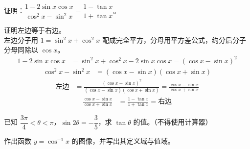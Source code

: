 \documentclass[12pt,a4paper]{exam-zh}
\begin{document}
\begin{question}[points = 6]
    证明：$\dfrac{1-2\sin x\cos x}{\cos^2 x-\sin^2 x}=\dfrac{1-\tan x}{1+\tan x}$。
\end{question}

\begin{solution}
    证明左边等于右边。 \\
    左边分子用 $1=\sin^2x+\cos^2x$ 配成完全平方，分母用平方差公式，约分后分子分母同除以 $\cos x$。 \\
    \begin{align*}
        1-2\sin x\cos x &= \sin^2x+\cos^2x-2\sin x\cos x = (\cos x-\sin x)^2
    \end{align*}
    \begin{align*}
        \cos^2x-\sin^2x &= (\cos x-\sin x)(\cos x+\sin x)
    \end{align*}
    \begin{align*}
        \text{左边} &= \frac{(\cos x-\sin x)^2}{(\cos x-\sin x)(\cos x+\sin x)} = \frac{\cos x-\sin x}{\cos x+\sin x}
    \end{align*}
    \begin{align*}
        \frac{\cos x-\sin x}{\cos x+\sin x} &= \frac{1-\tan x}{1+\tan x} = \text{右边}
    \end{align*}
\end{solution}

\begin{question}[points = 8]
    \begin{questionparts}
        \item 已知 $\dfrac{3\pi}{4}<\theta<\pi$，$\sin2\theta=-\dfrac{3}{5}$，求 $\tan\theta$ 的值。（不得使用计算器） 

        \item 作出函数 $y=\cos^{-1}x$ 的图像，并写出其定义域与值域。 
    \end{questionparts}
\end{question}
\end{document}
